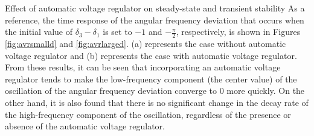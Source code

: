 \documentclass[graybox, envcountchap]{svmult}
\begin{document}
\begin{example}{Effect of automatic voltage regulator on steady-state and
transient stability}
As a reference, the time response of the angular frequency deviation that occurs
when the initial value of $\delta_3-\delta_1$ is set to $-1$ and
$-\frac{\pi}{2}$, respectively, is shown in Figures \ref{fig:avrsmalld} and
\ref{fig:avrlarged}. (a) represents the case without automatic voltage regulator
and (b) represents the case with automatic voltage regulator. From these
results, it can be seen that incorporating an automatic voltage regulator tends
to make the low-frequency component (the center value) of the oscillation of the
angular frequency deviation converge to 0 more quickly. On the other hand, it is
also found that there is no significant change in the decay rate of the
high-frequency component of the oscillation, regardless of the presence or
absence of the automatic voltage regulator.
\end{example}
\end{document}
